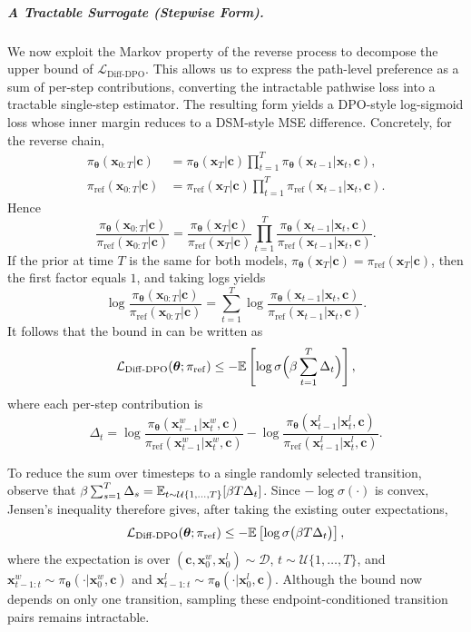 \subparagraph{A Tractable Surrogate (Stepwise Form).} We now exploit the Markov property of the reverse process to decompose the upper bound of $\mathcal L_{\mathrm{Diff\text{-}DPO}}$. This allows us to express the path-level preference as a sum of per-step contributions, converting the intractable pathwise loss into a tractable single-step estimator. The resulting form yields a DPO-style log-sigmoid loss whose inner margin reduces to a DSM-style MSE difference. Concretely, for the reverse chain,
\begin{align*}
    \pi_{\bm\theta}(\mathbf x_{0:T}| \mathbf c)
&=\pi_{\bm\theta}(\mathbf x_T| \mathbf c) \prod_{t=1}^{T}
\pi_{\bm\theta}(\mathbf x_{t-1}| \mathbf x_t,\mathbf c),
\\
\pi_{\mathrm{ref}}(\mathbf x_{0:T}| \mathbf c)
&=\pi_{\mathrm{ref}}(\mathbf x_T| \mathbf c) \prod_{t=1}^{T}
\pi_{\mathrm{ref}}(\mathbf x_{t-1}| \mathbf x_t,\mathbf c).
\end{align*}
Hence
\[
\frac{\pi_{\bm\theta}(\mathbf x_{0:T}| \mathbf c)}{\pi_{\mathrm{ref}}(\mathbf x_{0:T}| \mathbf c)}
=
\frac{\pi_{\bm\theta}(\mathbf x_T| \mathbf c)}{\pi_{\mathrm{ref}}(\mathbf x_T| \mathbf c)}
\prod_{t=1}^{T}
\frac{\pi_{\bm\theta}(\mathbf x_{t-1}| \mathbf x_t,\mathbf c)}
     {\pi_{\mathrm{ref}}(\mathbf x_{t-1}| \mathbf x_t,\mathbf c)}.
\]
If the prior at time $T$ is the same for both models,
$\pi_{\bm\theta}(\mathbf x_T| \mathbf c)=\pi_{\mathrm{ref}}(\mathbf x_T| \mathbf c)$,
then the first factor equals $1$, and taking logs yields
\[
\log\frac{\pi_{\bm\theta}(\mathbf x_{0:T}| \mathbf c)}{\pi_{\mathrm{ref}}(\mathbf x_{0:T}| \mathbf c)}
=\sum_{t=1}^{T}
\log\frac{\pi_{\bm\theta}(\mathbf x_{t-1}| \mathbf x_t,\mathbf c)}
         {\pi_{\mathrm{ref}}(\mathbf x_{t-1}| \mathbf x_t,\mathbf c)}.
\]
It follows that the bound in  can be written as
\[
\mathcal L_{\mathrm{Diff\text{-}DPO}}(\bm\theta;\pi_{\mathrm{ref}})
  \le  - \mathbb{E} \left[\log\sigma \Big(\beta \sum_{t=1}^T \Delta_t\Big)\right],
\]
where each per-step contribution is
\[
\Delta_t
= \log\frac{\pi_{\bm\theta}(\mathbf x^w_{t-1}|\mathbf x^w_t,\mathbf c)}
               {\pi_{\mathrm{ref}}(\mathbf x^w_{t-1}|\mathbf x^w_t,\mathbf c)}
- \log\frac{\pi_{\bm\theta}(\mathbf x^l_{t-1}|\mathbf x^l_t,\mathbf c)}
               {\pi_{\mathrm{ref}}(\mathbf x^l_{t-1}|\mathbf x^l_t,\mathbf c)}.
\]

To reduce the sum over timesteps to a single randomly selected transition,
observe that
$\beta\sum_{s=1}^T\Delta_s
=
\mathbb{E}_{t\sim\mathcal U\{1,\dots,T\}}[\beta T\Delta_t]$.
Since $-\log\sigma(\cdot)$ is convex, Jensen's inequality therefore gives,
after taking the existing outer expectations,
\[
\mathcal L_{\mathrm{Diff\text{-}DPO}}(\bm\theta;\pi_{\mathrm{ref}})
\leq
-\mathbb{E}\left[
\log\sigma\bigl(\beta T\Delta_t\bigr)
\right],
\]
where the expectation is over
$(\mathbf c,\mathbf x_0^w,\mathbf x_0^l)\sim\mathcal D$,
$t\sim\mathcal U\{1,\dots,T\}$, and
$\mathbf x_{t-1:t}^w\sim
\pi_{\bm\theta}(\cdot|\mathbf x_0^w,\mathbf c)$ and
$\mathbf x_{t-1:t}^l\sim
\pi_{\bm\theta}(\cdot|\mathbf x_0^l,\mathbf c)$.
Although the bound now depends on only one transition, sampling these
endpoint-conditioned transition pairs remains intractable.

